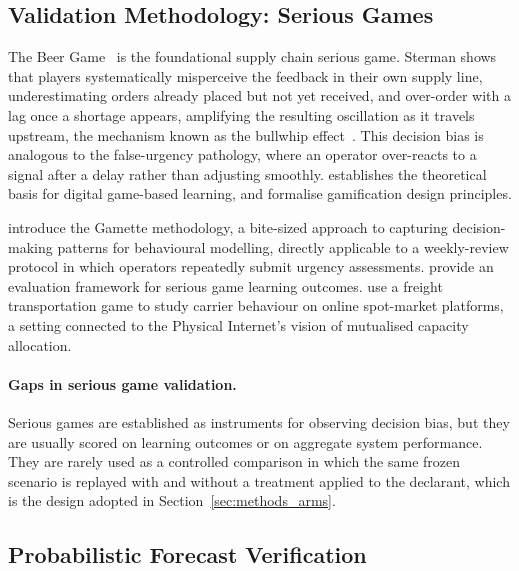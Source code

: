 \subsection{Validation Methodology: Serious Games}
\label{sec:lit_games}

The Beer Game~\autocite{sterman1989modeling} is the foundational supply chain serious game.
Sterman shows that players systematically misperceive the feedback in their own supply
line, underestimating orders already placed but not yet received, and over-order with a lag
once a shortage appears, amplifying the resulting oscillation as it travels upstream, the
mechanism known as the bullwhip effect~\autocite{lee1997bullwhip}. This decision bias is
analogous to the false-urgency pathology, where an operator over-reacts to a signal after a
delay rather than adjusting smoothly. \textcite{prensky2001digital} establishes the
theoretical basis for digital game-based learning, and \textcite{deterding2011game} formalise gamification design principles.

\textcite{mohaddesi2020gamettes} introduce the Gamette methodology, a
bite-sized approach to capturing decision-making patterns for behavioural modelling,
directly applicable to a weekly-review protocol in which operators repeatedly submit
urgency assessments. \textcite{bellotti2013framework} provide an evaluation
framework for serious game learning outcomes. \textcite{lafkihi2025freight} use a freight transportation game to study carrier
behaviour on online spot-market platforms, a setting connected to the Physical Internet's
vision of mutualised capacity allocation.

\paragraph{Gaps in serious game validation.}
Serious games are established as instruments for observing decision bias, but they are
usually scored on learning outcomes or on aggregate system performance. They are rarely
used as a controlled comparison in which the same frozen scenario is replayed with and
without a treatment applied to the declarant, which is the design adopted in
Section~\ref{sec:methods_arms}.

\subsection{Probabilistic Forecast Verification}
\label{sec:lit_verification}

